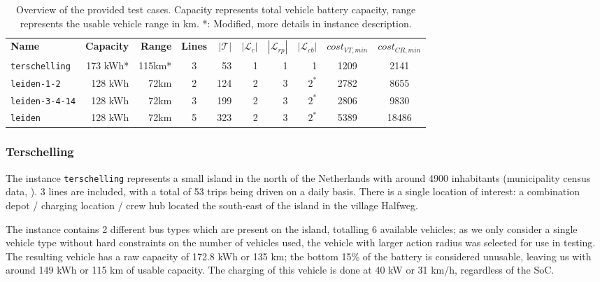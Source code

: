 \documentclass[]{article}
\begin{document}
\begin{table}[h]
  \centering
  \begin{tabular}{lrrcrrrrcc}
    \toprule
       \textbf{Name} & \textbf{Capacity} & \textbf{Range} & \textbf{Lines} & $|\mathcal{T}|$ & $|\mathcal{L}_c|$ & $|\mathcal{L}_{rp}|$ & $|\mathcal{L}_{cb}|$ & $cost_{VT,min}$ & $cost_{CR,min}$ \\
        \cmidrule(lr){1-1}\cmidrule(lr){2-3}\cmidrule(lr){4-8} \cmidrule(lr){9-10}
        \texttt{terschelling}  & 173 kWh* & 115km* & 3 & 53 & 1 & 1 & 1  & 1209 & 2141 \\
        \texttt{leiden-1-2}  & 128 kWh & 72km & 2 & 124 & 2 & 3 & $2^*$  & 2782 & 8655 \\
        \texttt{leiden-3-4-14} & 128 kWh & 72km & 3 & 199 & 2 & 3 & $2^*$  & 2806 & 9830 \\
        \texttt{leiden}  & 128 kWh & 72km & 5 & 323 & 2 & 3 & $2^*$ & 5389 & 18486 \\
        \bottomrule
  \end{tabular}
  \caption{Overview of the provided test cases. Capacity represents total vehicle battery capacity, range represents the usable vehicle range in km. *: Modified, more details in instance description.}
  \label{tab:instances}
\end{table}

\subsubsection{Terschelling}
The instance \texttt{terschelling} represents a small island in the north of the Netherlands with around 4900 inhabitants (municipality census data, \citet{Terschelling2025}). 3 lines are included, with a total of 53 trips being driven on a daily basis. There is a single location of interest: a combination depot / charging location / crew hub located the south-east of the island in the village Halfweg. 

The instance contains 2 different bus types which are present on the island, totalling 6 available vehicles; as we only consider a single vehicle type without hard constraints on the number of vehicles used, the vehicle with larger action radius was selected for use in testing. The resulting vehicle has a raw capacity of 172.8 kWh or 135 km; the bottom 15\% of the battery is considered unusable, leaving us with around 149 kWh or 115 km of usable capacity. The charging of this vehicle is done at 40 kW or 31 km/h, regardless of the SoC.
\end{document}
